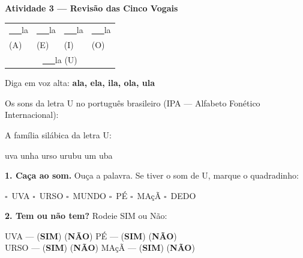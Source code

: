 \begin{consolidacao}
\textbf{Atividade 3 --- Revis\~a{}o das Cinco Vogais}


\begin{center}
\begin{tabular}{llll}
\underline{~~~}la & \underline{~~~}la & \underline{~~~}la & \underline{~~~}la \\
(A) & (E) & (I) & (O) \\[0.5em]
\multicolumn{4}{c}{\underline{~~~}la \quad (U)}
\end{tabular}
\end{center}
Diga em voz alta: \textbf{ala, ela, ila, ola, ula}

\end{consolidacao}


\begin{sonsdaletra}
Os sons da letra U no portugu\^es{} brasileiro (IPA --- Alfabeto Fon\'etico Internacional):

\end{sonsdaletra}


\begin{familiasilabica}
A fam\'ilia sil\'abica da letra U:

\begin{center}
uva \quad unha \quad urso \quad urubu \quad um \quad uba
\end{center}
\end{familiasilabica}


\begin{somletra}
\textbf{1. Ca\c{c}a ao som.} Ou\c{c}a a palavra. Se tiver o som de U, marque o quadradinho:
\begin{center}
$\square$~UVA \quad $\square$~URSO \quad $\square$~MUNDO \quad $\square$~P\'E \quad $\square$~MA\c{c}\~A \quad $\square$~DEDO
\end{center}

\textbf{2. Tem ou n\~ao{} tem?} Rodeie SIM ou N\~ao:
\begin{center}
UVA --- (\textbf{SIM}) (\textbf{N\~AO}) \quad P\'E --- (\textbf{SIM}) (\textbf{N\~AO}) \\ URSO --- (\textbf{SIM}) (\textbf{N\~AO}) \quad MA\c{c}\~A --- (\textbf{SIM}) (\textbf{N\~AO})
\end{center}
\end{somletra}

